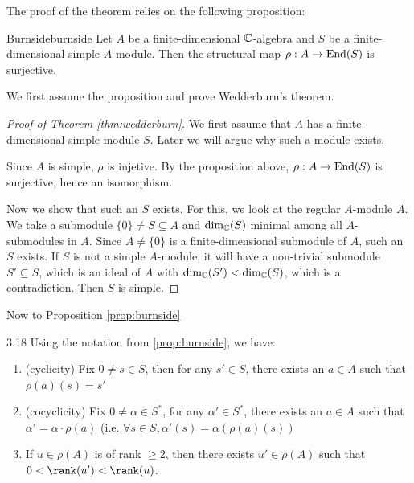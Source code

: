\documentclass[twoside = false,	%
		headsepline,		%
		parskip = true,
		]{scrbook}						%
\begin{document}
    The proof of the theorem relies on the following proposition:

    \begin{proposition}{Burnside}{burnside}
        Let $A$ be a finite-dimensional $\mathbb C$-algebra and $S$ be a finite-dimensional simple $A$-module. Then the structural map $\rho: A \to \mathrm{End}(S)$ is surjective.
    \end{proposition}

    We first assume the proposition and prove Wedderburn's theorem.

    \begin{proof}[Proof of Theorem \ref{thm:wedderburn}]

        We first assume that $A$ has a finite-dimensional simple module $S$. Later we will argue why such a module exists.
        
        Since $A$ is simple, $\rho$ is injetive. By the proposition above, $\rho: A \to \mathrm{End}(S)$ is surjective, hence an isomorphism.

        Now we show that such an $S$ exists. For this, we look at the regular $A$-module $A$. We take a submodule $\{0\} \neq S \subseteq A$ and $\dim_\mathbb C(S)$ minimal among all $A$-submodules in $A$. Since $A \neq \{0\}$ is a finite-dimensional submodule of $A$, such an $S$ exists. If $S$ is not a simple $A$-module, it will have a non-trivial submodule $S' \subseteq S$, which is an ideal of $A$ with $\dim_\mathbb C(S') < \dim_\mathbb C(S)$, which is a contradiction. Then $S$ is simple.
    \end{proof}

    Now to Proposition \ref{prop:burnside}

    \begin{lemma}{}{3.18}
        Using the notation from \ref{prop:burnside}, we have:
        \begin{enumerate}
            \item (cyclicity) Fix $0 \neq s \in S$, then for any $s' \in S$, there exists an $a \in A$ such that $\rho(a)(s) = s'$
            \item (cocyclicity) Fix $0 \neq \alpha \in S^*$, for any $\alpha' \in S^*$, there exists an $a \in A$ such that $\alpha' = \alpha \cdot \rho(a)$ (i.e. $\forall s \in S, \alpha'(s) = \alpha(\rho(a)(s))$
            \item If $u \in \rho(A)$ is of rank $\geq 2$, then there exists $u' \in \rho(A)$ such that $0 < \rank(u') < \rank(u)$.
        \end{enumerate}
    \end{lemma}
\end{document}
